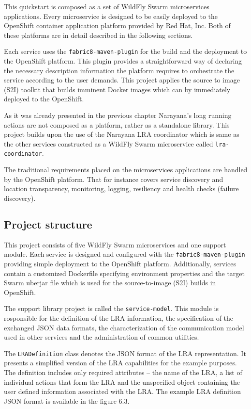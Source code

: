 \documentclass[oneside,
  digital, %
  table,   %
  nolof,     %
  nolot,     %
]{fithesis3}
\begin{document}
This quickstart is composed as a set of WildFly Swarm microservices applications. Every microservice is designed to be easily deployed to the OpenShift container application platform provided by Red Hat, Inc. Both of these platforms are in detail described in the following sections.

Each service uses the \texttt{fabric8-maven-plugin} for the build and the deployment to the OpenShift platform. This plugin provides a straightforward way of declaring the necessary description information the platform requires to orchestrate the service according to the user demands. This project applies the source to image (S2I) toolkit that builds imminent Docker images which can by immediately deployed to the OpenShift. 

As it was already presented in the previous chapter Narayana's long running actions are not composed as a platform, rather as a standalone library. This project builds upon the use of the Narayana LRA coordinator which is same as the other services constructed as a WildFly Swarm microservice called \texttt{lra-coordinator}. 

The traditional requirements placed on the microservices applications are handled by the OpenShift platform. That for instance covers service discovery and location transparency, monitoring, logging, resiliency and health checks (failure discovery). 


\subsection{Project structure}

This project consists of five WildFly Swarm microservices and one support module. Each service is designed and configured with the \texttt{fabric8-maven-plugin} providing simple deployment to the OpenShift platform. Additionally, services contain a customized Dockerfile specifying environment properties and the target Swarm uberjar file which is used for the source-to-image (S2I) builds in OpenShift.

The support library project is called the \texttt{service-model}. This module is rosponsible for the definition of the LRA information, the specification of the exchanged JSON data formats, the characterization of the communication model used in other services and the administration of common utilities.

The \texttt{LRADefinition} class denotes the JSON format of the LRA representation. It presents a simplified version of the LRA capabilities for the example purposes. The definition includes only required attributes -- the name of the LRA, a list of individual actions that form the LRA and the unspecified object containing the user defined information associated with the LRA. The example LRA definition JSON format is available in the figure 6.3.
\end{document}
